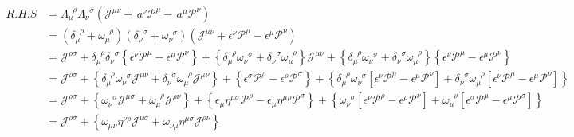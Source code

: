     \[
        \begin{aligned}
                    R.H.S&=\Lambda_\mu^{\;\;\rho}\Lambda^{\;\;\sigma}_\nu
                    \left(\mathscr{J}^{\mu\nu}
                    +\,a^\nu\mathscr{P}^\mu
                    -\,a^\mu\mathscr{P}^\nu\right)
                    \\&=\left(\delta_\mu^{\;\;\rho}+\omega_\mu^{\;\;\rho}\right)\left(\delta_\nu^{\;\;\sigma}+\omega_\nu^{\;\;\sigma}\right)
                    \left(\mathscr{J}^{\mu\nu}+\epsilon^\nu\mathscr{P}^\mu-\epsilon^\mu\mathscr{P}^\nu\right)
                    \\&=\mathscr{J}^{\rho\sigma}+
                    \delta_\mu^{\;\;\rho}\delta_\nu^{\;\;\sigma}\left\{\epsilon^\nu\mathscr{P}^\mu-\epsilon^\mu\mathscr{P}^\nu\right\}
                    +\left\{\delta_\mu^{\;\;\rho}\omega_\nu^{\;\;\sigma}+\delta_\nu^{\;\;\sigma}\omega_\mu^{\;\;\rho}\right\}\mathscr{J}^{\mu\nu}
                    +\left\{\delta_\mu^{\;\;\rho}\omega_\nu^{\;\;\sigma}+\delta_\nu^{\;\;\sigma}\omega_\mu^{\;\;\rho}\right\}
                    \left\{\epsilon^\nu\mathscr{P}^\mu-\epsilon^\mu\mathscr{P}^\nu\right\}
                    \\&=\mathscr{J}^{\rho\sigma}+
                    \left\{\delta_\mu^{\;\;\rho}\omega_\nu^{\;\;\sigma}\mathscr{J}^{\mu\nu}+\delta_\nu^{\;\;\sigma}\omega_\mu^{\;\;\rho}\mathscr{J}^{\mu\nu}\right\}
                    +\left\{\epsilon^\sigma\mathscr{P}^\rho-\epsilon^\rho\mathscr{P}^\sigma\right\}
                    +\left\{\delta_\mu^{\;\;\rho}\omega_\nu^{\;\;\sigma} \left[\epsilon^\nu\mathscr{P}^\mu-\epsilon^\mu\mathscr{P}^\nu\right]
                    +\delta_\nu^{\;\;\sigma}\omega_\mu^{\;\;\rho}\left[\epsilon^\nu\mathscr{P}^\mu-\epsilon^\mu\mathscr{P}^\nu\right]\right\}
                    \\&=\mathscr{J}^{\rho\sigma}+
                    \left\{\omega_\nu^{\;\;\sigma}\mathscr{J}^{\mu\sigma}+\omega_\mu^{\;\;\rho}\mathscr{J}^{\rho\nu}\right\}
                    +\left\{\epsilon_\mu\eta^{\mu\sigma}\mathscr{P}^\rho-\epsilon_\mu\eta^{\mu\rho}\mathscr{P}^\sigma\right\}
                    +\left\{\omega_\nu^{\;\;\sigma}\left[\epsilon^\nu\mathscr{P}^\rho-\epsilon^\rho\mathscr{P}^\nu\right]
                    +\omega_\mu^{\;\;\rho}\left[\epsilon^\sigma\mathscr{P}^\mu-\epsilon^\mu\mathscr{P}^\sigma\right]\right\}\\
                    &=\mathscr{J}^{\rho\sigma}+
                    \left\{\omega_{\mu\nu}\eta^{\nu\rho}\mathscr{J}^{\mu\sigma}+\omega_{\nu\mu}\eta^{\mu\sigma}\mathscr{J}^{\rho\nu}\right\}

\end{aligned}\]
